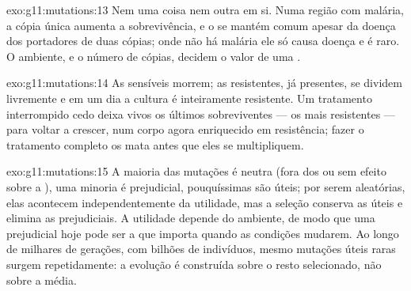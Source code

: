 \begin{solution}{exo:g11:mutations:13}
Nem uma coisa nem outra em si. Numa região com malária, a cópia única
aumenta a sobrevivência, e o  se mantém comum apesar da doença dos
portadores de duas cópias; onde não há malária ele só causa doença e é
raro. O ambiente, e o número de cópias, decidem o valor de uma .
\end{solution}

\begin{solution}{exo:g11:mutations:14}
As  sensíveis morrem; as resistentes, já presentes, se dividem
livremente e em um dia a cultura é inteiramente resistente. Um
tratamento interrompido cedo deixa vivos os últimos sobreviventes ---
os mais resistentes --- para voltar a crescer, num corpo agora
enriquecido em resistência; fazer o tratamento completo os mata antes
que eles se multipliquem.
\end{solution}

\begin{solution}{exo:g11:mutations:15}
A maioria das mutações é neutra (fora dos  ou sem efeito sobre a
), uma minoria é prejudicial, pouquíssimas são úteis; por serem
aleatórias, elas acontecem independentemente da utilidade, mas a
seleção conserva as úteis e elimina as prejudiciais. A utilidade
depende do ambiente, de modo que uma  prejudicial hoje pode ser
a que importa quando as condições mudarem. Ao longo de milhares de
gerações, com bilhões de indivíduos, mesmo mutações úteis raras surgem
repetidamente: a evolução é construída sobre o resto selecionado, não
sobre a  média.
\end{solution}

